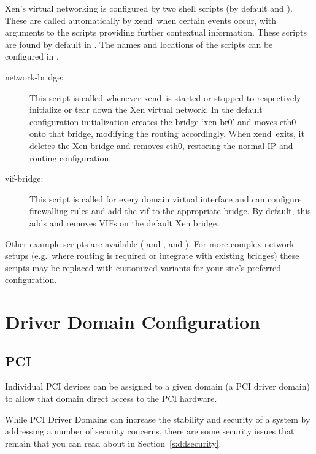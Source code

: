 \documentclass[11pt,twoside,final,openright]{report}
\def\xend{{xend}\xspace}
\begin{document}
Xen's virtual networking is configured by two shell scripts (by
default  and ).  These are called
automatically by \xend\ when certain events occur, with arguments to
the scripts providing further contextual information.  These scripts
are found by default in .  The names and
locations of the scripts can be configured in
.

\begin{description}
\item[network-bridge:] This script is called whenever \xend\ is started or
  stopped to respectively initialize or tear down the Xen virtual
  network. In the default configuration initialization creates the
  bridge `xen-br0' and moves eth0 onto that bridge, modifying the
  routing accordingly. When \xend\ exits, it deletes the Xen bridge
  and removes eth0, restoring the normal IP and routing configuration.


\item[vif-bridge:] This script is called for every domain virtual
  interface and can configure firewalling rules and add the vif to the
  appropriate bridge. By default, this adds and removes VIFs on the
  default Xen bridge.
\end{description}

Other example scripts are available ( and
,  and ).
For more complex network setups (e.g.\ where routing is required or
integrate with existing bridges) these scripts may be replaced with
customized variants for your site's preferred configuration.

\section{Driver Domain Configuration}
\label{s:ddconf}

\subsection{PCI}
\label{ss:pcidd}

Individual PCI devices can be assigned to a given domain (a PCI driver domain)
to allow that domain direct access to the PCI hardware.

While PCI Driver Domains can increase the stability and security of a system
by addressing a number of security concerns, there are some security issues
that remain that you can read about in Section~\ref{s:ddsecurity}.
\end{document}

